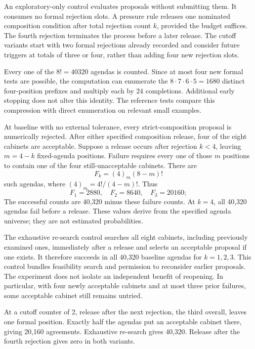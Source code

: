 An exploratory-only control evaluates proposals without submitting them. It consumes no formal rejection slots. A pressure rule releases one nominated composition condition after total rejection count \(k\), provided the budget suffices. The fourth rejection terminates the process before a later release. The cutoff variants start with two formal rejections already recorded and consider future triggers at totals of three or four, rather than adding four new rejection slots.

Every one of the \(8!=40320\) agendas is counted. Since at most four new formal tests are possible, the computation can enumerate the \(8\cdot7\cdot6\cdot5=1680\) distinct four-position prefixes and multiply each by 24 completions. Additional early stopping does not alter this identity. The reference tests compare this compression with direct enumeration on relevant small examples.

At baseline with no external tolerance, every strict-composition proposal is numerically rejected. After either specified composition release, four of the eight cabinets are acceptable. Suppose a release occurs after rejection \(k<4\), leaving \(m=4-k\) fixed-agenda positions. Failure requires every one of those \(m\) positions to contain one of the four still-unacceptable cabinets. There are
\[
F_k=(4)_m(8-m)!
\]
such agendas, where \((4)_m=4!/(4-m)!\). Thus
\[
F_1=2880,\quad F_2=8640,\quad F_3=20160;
\]
The successful counts are 40,320 minus these failure counts. At \(k=4\), all 40,320 agendas fail before a release. These values derive from the specified agenda universe; they are not estimated probabilities.

The exhaustive re-search control searches all eight cabinets, including previously examined ones, immediately after a release and selects an acceptable proposal if one exists. It therefore succeeds in all 40,320 baseline agendas for \(k=1,2,3\). This control bundles feasibility search and permission to reconsider earlier proposals. The experiment does not isolate an independent benefit of reopening. In particular, with four newly acceptable cabinets and at most three prior failures, some acceptable cabinet still remains untried.

At a cutoff counter of 2, release after the next rejection, the third overall, leaves one formal position. Exactly half the agendas put an acceptable cabinet there, giving 20,160 agreements. Exhaustive re-search gives 40,320. Release after the fourth rejection gives zero in both variants.

